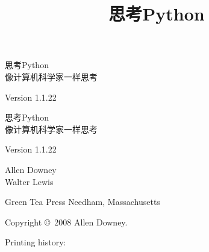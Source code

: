 \documentclass[10pt]{book}
\title{思考Python}
\newcommand{\theversion}{1.1.22}
\begin{document}
\fontmatter



\newtheorem{ex}{Exercise}[chapter]
\begin{latexonly}

\renewcommand{\blankpage}{\thispagestyle{empty} \qud \newpage}


\thispagestyle{empty}
\begin{flushright}
\vspace*{2.0in}

\begin{spacing}{3}
{\huge 思考Python}\\
{\Large 像计算机科学家一样思考}
\end{spacing}

\vspace{0.25in}

Version \theversion

\vfill
\end{flushright}

\blankpage
\blankpage

\pagebreak
\thispagestyle{empty}

\begin{flushright}
\vspace*{2.0in}

\begin{spacing}{3}
{\huge 思考Python}\\
{\Large 像计算机科学家一样思考}
\end{spacing}

\vspace{0.25in}
Version \theversion

{\Large
	Allen Downey\\
}
{\Large 
	Walter Lewis\\
}



\vspace{0.5in}

{\Large Green Tea Press}
{\small Needham, Massachusetts}

\vfill
\end{flushright}

\pagebreak
\thispagestyle{empty}

{\small
	Copyright \copyright ~2008 Allen Downey.

Printing history:

}
\end{latexonly}
\end{document}
